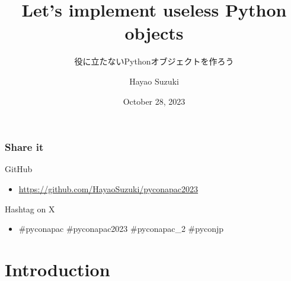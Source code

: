 \documentclass[aspectratio=169,dvipdfmx,12pt,notheorems]{beamer}
\title{Let's implement useless Python objects}
\subtitle{役に立たないPythonオブジェクトを作ろう}
\author[Hayao]{Hayao Suzuki}
\institute[PyCon APAC 2023]{PyCon APAC 2023}
\date{October 28, 2023}
\theoremstyle{definition}
\begin{document}
\begin{frame}[plain]\frametitle{}
\titlepage %
\end{frame}

\begin{frame}\frametitle{Share it}

\begin{block}{GitHub}
\begin{itemize}
\item \url{https://github.com/HayaoSuzuki/pyconapac2023}
\end{itemize}
\end{block}

\begin{block}{Hashtag on  X}
\begin{itemize}
\item \#pyconapac \#pyconapac2023 \#pyconapac\_2 \#pyconjp
\end{itemize}
\end{block}

\end{frame}

\section{Introduction}
\end{document}
